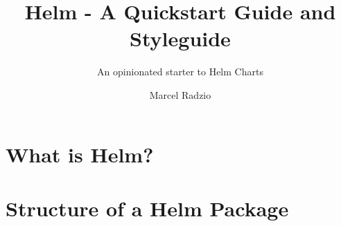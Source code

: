 \documentclass[english,10pt,a4paper]{scrbook}
\title{Helm - A Quickstart Guide and Styleguide}
\subtitle{An opinionated starter to Helm Charts}
\author{Marcel Radzio}
\begin{document}
\maketitle
\tableofcontents

\chapter{What is Helm?}


\chapter{Structure of a Helm Package}



\cleardoublepage
\appendix
\printglossaries

\nocite{*}
\printbibliography[heading=bibintoc,title={Sources}]

\listoffigures
\end{document}
